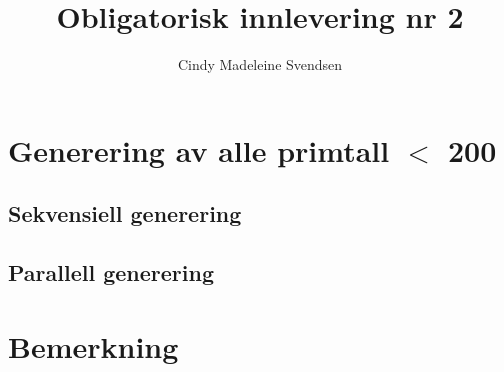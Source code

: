 \documentclass[18pt]{article}
\author{Cindy Madeleine Svendsen}
\title{Obligatorisk innlevering nr 2}
\begin{document}
\maketitle
\section{Generering av alle primtall \(<\) 200}
\subsection{Sekvensiell generering}
\subsection{Parallell generering}
\section{Bemerkning}
\end{document}
